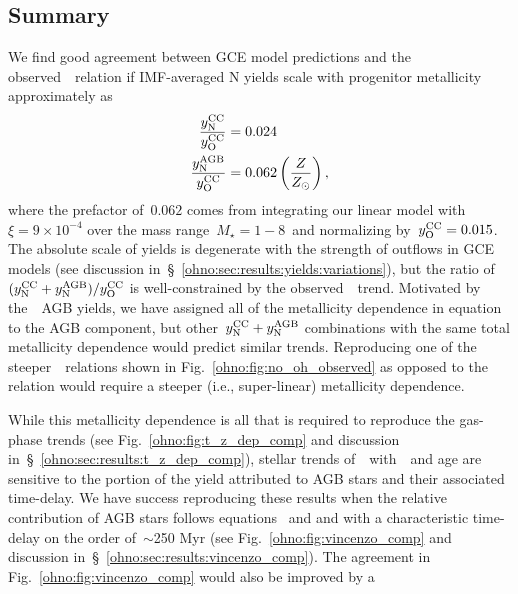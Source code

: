 \subsection{Summary}
\label{ohno:sec:results:summary}
We find good agreement between GCE model predictions and the
observed~\ohno~relation if IMF-averaged N yields scale with progenitor
metallicity approximately as
\begin{subequations}\begin{align}
\frac{y_\text{N}^\text{CC}}{y_\text{O}^\text{CC}} &= 0.024
\label{ohno:eq:advocated_n_cc_yield}
\\
\frac{y_\text{N}^\text{AGB}}{y_\text{O}^\text{CC}} &= 0.062\left(\frac{Z}{Z_\odot}\right),
\label{ohno:eq:advocated_n_agb_yield}
\end{align}
\label{ohno:eq:advocated_n_yield}%
\end{subequations}
where the prefactor of~$0.062$ comes from integrating our linear model with
$\xi = 9\times10^{-4}$ over the mass range~$M_\star = 1 - 8$~\msun and
normalizing by~$y_\text{O}^\text{CC} = 0.015$.
The absolute scale of yields is degenerate with the strength of outflows in GCE
models (see discussion in~\S~\ref{ohno:sec:results:yields:variations}), but the
ratio of~$(y_\text{N}^\text{CC} + y_\text{N}^\text{AGB}) / y_\text{O}^\text{CC}$ is well-constrained by
the observed~\ohno~trend.
Motivated by the~\cristallo~AGB yields, we have assigned all of the metallicity
dependence in equation~ to the AGB component, but
other~$y_\text{N}^\text{CC} + y_\text{N}^\text{AGB}$ combinations with the same total
metallicity dependence would predict similar trends.
Reproducing one of the steeper~\ohno~relations shown in
Fig.~\ref{ohno:fig:no_oh_observed} as opposed to the~\citet{Dopita2016} relation
would require a steeper (i.e., super-linear) metallicity dependence.
\par
While this metallicity dependence is all that is required to
reproduce the gas-phase trends (see Fig.~\ref{ohno:fig:t_z_dep_comp} and discussion
in~\S~\ref{ohno:sec:results:t_z_dep_comp}), stellar trends of~\no~with~\ofe~and age
are sensitive to the portion of the yield attributed to AGB stars and their
associated time-delay.
We have success reproducing these results when the relative contribution of
AGB stars follows equations~ and
 and with a characteristic time-delay on the
order of~$\sim$250 Myr (see Fig.~\ref{ohno:fig:vincenzo_comp} and discussion
in~\S~\ref{ohno:sec:results:vincenzo_comp}).
The agreement in Fig.~\ref{ohno:fig:vincenzo_comp} would also be improved by a
